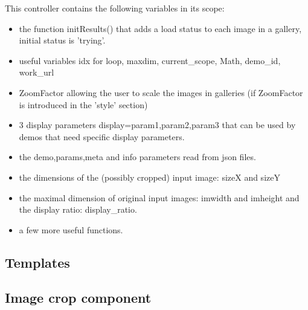 This controller contains the following variables in its scope:
\begin{itemize}
 \item the function initResults() that adds a load status to each image
        in a gallery, initial status is 'trying'.
 \item useful variables idx for loop, maxdim, current\_scope, Math, demo\_id,
      work\_url
  \item ZoomFactor allowing the user to scale the images in galleries 
        (if ZoomFactor is introduced in the 'style' section)
  \item 3 display parameters display={param1,param2,param3} that can be used
        by demos that need specific display parameters.
  \item the demo,params,meta and info parameters read from json files.
  \item the dimensions of the (possibly cropped) input image: sizeX and sizeY 
  \item the maximal dimension of original input images: imwidth and imheight and 
        the display ratio: display\_ratio.
  \item a few more useful functions.
\end{itemize}


\subsection{Templates}
\subsection{Image crop component}
